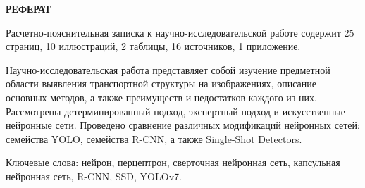 \begin{center}
    \textbf{РЕФЕРАТ}
\end{center}
\setcounter{page}{3}

Расчетно-пояснительная записка к научно-исследовательской работе содержит 25 страниц, 10 иллюстраций, 2 таблицы, 16 источников, 1 приложение.

Научно-исследовательская работа представляет собой изучение предметной области выявления транспортной структуры на изображениях, описание основных методов, а также преимуществ и недостатков каждого из них. Рассмотрены детерминированный подход, экспертный подход и искусственные нейронные сети. Проведено сравнение различных модификаций нейронных сетей: семейства YOLO, семейства R-CNN, а также Single-Shot Detectors.

Ключевые слова: нейрон, перцептрон, сверточная нейронная сеть, капсульная нейронная сеть, R-CNN, SSD, YOLOv7.
